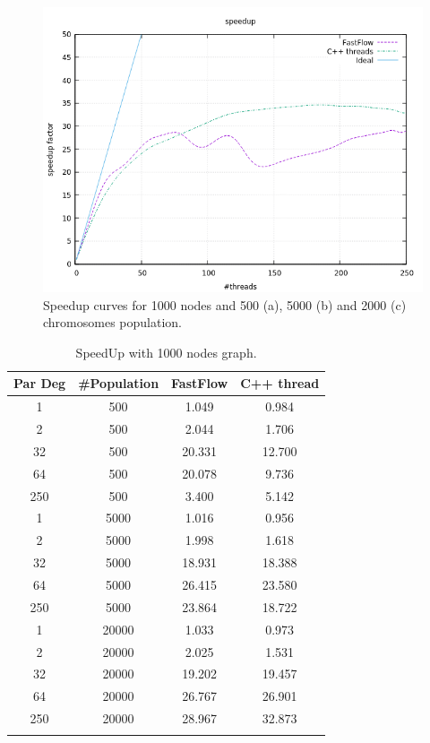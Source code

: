 \documentclass[a4paper,10pt]{article}
\begin{document}
\begin{figure}[H]
			\begin{minipage}[t]{0.32\linewidth}
				\includegraphics[width=\linewidth]{BenchMarkTSP/speedup/1000/SU100020000_zoom.png}
				\subcaption{}
			\end{minipage}
			\caption{Speedup curves for 1000 nodes and 500 (a), 5000 (b) and 2000 (c) chromosomes population.}
			\label{1000}
		\end{figure}

\begin{center}
	\small\addtolength{\tabcolsep}{5pt}
			\centering
	\begin{longtable}{|c|c|c|c|}
		\hline
		\textbf{Par Deg} & \textbf{\#Population} & \textbf{FastFlow} & \textbf{C++ thread}  \\ \hline
		1         &  500     & 1.049 &  0.984   \\ \hline
		2         &  500     & 2.044 &  1.706   \\ \hline
		32       &  500     & 20.331 &  12.700   \\ \hline
		64       &  500     & 20.078 &  9.736   \\ \hline
		250     &  500     & 3.400 &  5.142   \\ \hline
		1         &  5000   & 1.016 &  0.956   \\ \hline
		2         &  5000   & 1.998 &  1.618   \\ \hline
		32       &  5000   & 18.931 &  18.388   \\ \hline
		64       &  5000   & 26.415 &  23.580   \\ \hline
		250     &  5000   & 23.864 &  18.722   \\ \hline
		1         &  20000 & 1.033 &  0.973   \\ \hline
		2         &  20000 & 2.025 &  1.531   \\ \hline
		32       &  20000 & 19.202 &  19.457   \\ \hline
		64       &  20000 & 26.767 &  26.901   \\ \hline
		250     &  20000 & 28.967 &  32.873   \\ \hline				
		\caption{SpeedUp with 1000 nodes graph.}	
		\label{tab:dati1000}
	\end{longtable}	
\end{center}
\end{document}
